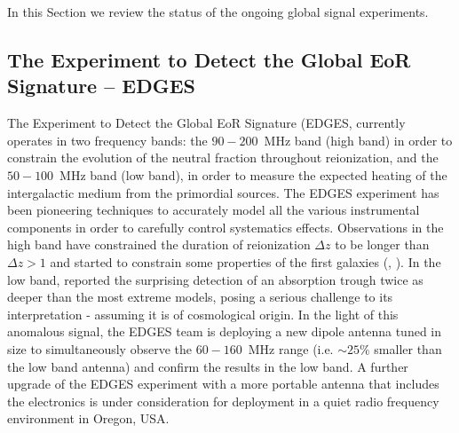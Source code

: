 In this Section we review the status of the ongoing global signal experiments. 

\subsection{The Experiment to Detect the Global EoR Signature -- EDGES}
The Experiment to Detect the Global EoR Signature (EDGES, \cite{bowman08} currently operates in two frequency bands: the $90-200$~MHz band (high band) in order to constrain the evolution of the neutral fraction throughout reionization, and the $50-100$~MHz band (low band), in order to measure the expected heating of the intergalactic medium from the primordial sources. 
The EDGES experiment has been pioneering techniques to accurately model all the various instrumental components in order to carefully control systematics effects. Observations in the high band have constrained the duration of reionization $\Delta z$ to be longer than $\Delta z >  1$ and started to constrain some properties of the first galaxies (\cite{monsalve17}, \cite{monsalve18}). In the low band, \cite{bowman18} reported the surprising detection of an absorption trough twice as deeper than the most extreme models, posing a serious challenge to its interpretation - assuming it is of cosmological origin. 
In the light of this anomalous signal, the EDGES team is deploying a new dipole antenna tuned in size to simultaneously observe the $60-160$~MHz range (i.e. $\sim 25\%$ smaller than the low band antenna) and confirm the results in the low band. A further upgrade of the EDGES experiment with a more portable antenna that includes the electronics is under consideration for deployment in a quiet radio frequency environment in Oregon, USA.




